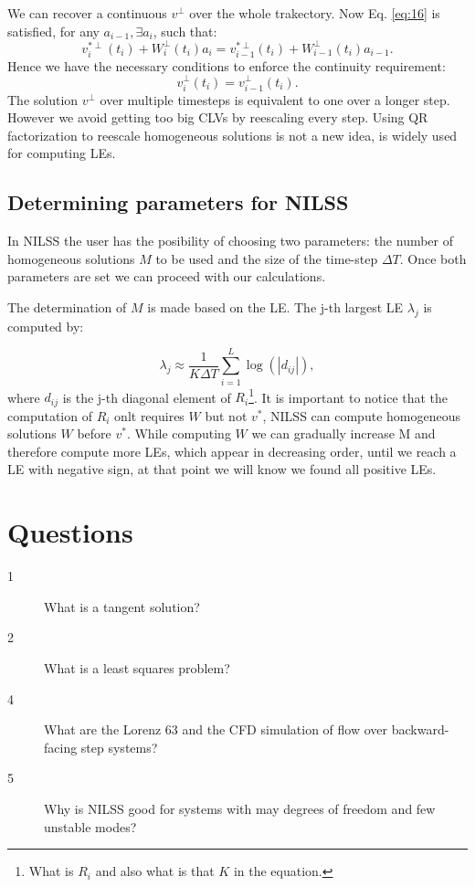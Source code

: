 \documentclass[10pt,twoside,a4paper]{article} %
\begin{document}
We can recover a continuous $v^\perp$ over the whole trakectory. Now Eq. \ref{eq:16} is satisfied, for any $a_{i-1}, \exists a_i$, such that:
\begin{equation}
  v_i^{*\perp}(t_i) + W_i^\perp (t_i)a_i = v_{i-1}^{*\perp}(t_i) + W_{i-1}^\perp(t_i)a_{i-1}.
  \label{eq:20}
\end{equation}
Hence we have the necessary conditions to enforce the continuity requirement:
\begin{equation}
  v_i^\perp(t_i) = v_{i-1}^\perp(t_i).
  \label{eq:21}
\end{equation}
The solution $v^\perp$ over multiple timesteps is equivalent to one over a longer step. However we avoid getting too big CLVs by reescaling every step. Using QR factorization to reescale homogeneous solutions is not a new idea, is widely used for computing LEs\cite{chater}.

\subsection{Determining parameters for NILSS}

In NILSS the user has the posibility of choosing two parameters: the number of homogeneous solutions $M$ to be used and the size of the time-step $\Delta T$. Once both parameters are set we can proceed with our calculations.

The determination of $M$ is made based on the LE. The j-th largest LE $\lambda_j$ is computed by:

\begin{equation}
  \lambda_j \approx \frac{1}{K\Delta T} \sum_{i=1}^L \log{(|d_{ij}|)},
  \label{eq:22}
\end{equation}
where $d_{ij}$ is the j-th diagonal element of $R_i$\footnote{What is $R_i$ and also what is that $K$ in the equation.}. It is important to notice that the computation of ${R_i}$ onlt requires $W$ but not $v^*$, NILSS can compute homogeneous solutions $W$ before $v^*$. While computing $W$ we can gradually increase M and therefore compute more LEs, which appear in decreasing order, until we reach a LE with negative sign, at that point we will know we found all positive LEs.

\section{Questions}
\begin{description}
  \item [1] What is a tangent solution?
  \item [2] What is a least squares problem?
  \item [4] What are the Lorenz 63 and the CFD simulation of flow over backward-facing step systems?
  \item [5] Why is NILSS good for systems with may degrees of freedom and few unstable modes?
\end{description}
\newpage
\end{document}
